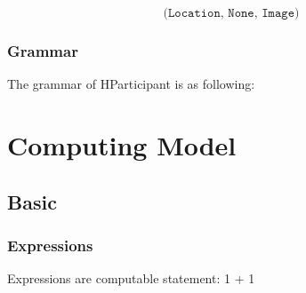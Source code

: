\begin{equation}\label{eq:Return2}
    \texttt{(Location, None, Image)}
\end{equation}

\subsubsection{Grammar}
The grammar of HParticipant is as following:

\begin{grammar}
\end{grammar}


\section{Computing Model}
\subsection{Basic}
\subsubsection{Expressions}
Expressions are computable statement:
1 + 1
